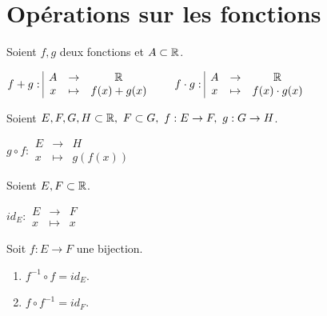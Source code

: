 \section{Opérations sur les fonctions}
\begin{definition}
	Soient $f, g$ deux fonctions et $A \subset \mathbb{R}$.
	\begin{center}
		$
		f + g :
		\begin{array}{|ccc}
			A & \to & \mathbb{R} \\
		    x & \mapsto & f(x) + g(x)
		\end{array}
		\qquad
		f \cdot g :
		\begin{array}{|ccc}
			A & \to & \mathbb{R} \\
		    x & \mapsto & f(x) \cdot g(x)
		\end{array}
		$
	\end{center}
\end{definition}

\begin{definition}
	Soient $E, F, G, H \subset \mathbb{R},\ F \subset G,\ f : E \to F,\ g : G \to H$.
	\begin{center}
		$
		g \circ f :
		\begin{array}{|ccc}
			E & \to & H \\
		            x & \mapsto & g(f(x))
		\end{array}
		$
	\end{center}
\end{definition}

\begin{definition}
    Soient $E, F \subset \mathbb{R}$.
	\begin{center}
		$
		id_E : 
		\begin{array}{|ccc}
			E & \to & F \\
			x & \mapsto & x
		\end{array}
		$
	\end{center}
\end{definition}

\begin{proposition}
	Soit $f : E \to F$ une bijection.
    \begin{multicols}{2}
        \begin{enumerate}
            \item $f^{-1} \circ f = id_E$.
            \item $f \circ f^{-1} = id_F$.
        \end{enumerate}
    \end{multicols}
\end{proposition}

